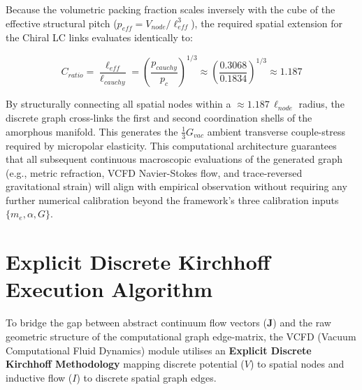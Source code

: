 Because the volumetric packing fraction scales inversely with the cube of the effective structural pitch ($p_{eff} = V_{node} / \ell_{eff}^3$), the required spatial extension for the Chiral LC links evaluates identically to:

\begin{equation}
    C_{ratio} = \frac{\ell_{eff}}{\ell_{cauchy}} = \left( \frac{p_{cauchy}}{p_{c}} \right)^{1/3} \approx \left( \frac{0.3068}{0.1834} \right)^{1/3} \approx \mathbf{1.187}
\end{equation}

By structurally connecting all spatial nodes within a $\approx 1.187 \, \ell_{node}$ radius, the discrete graph cross-links the first and second coordination shells of the amorphous manifold. This generates the $\frac{1}{3} G_{vac}$ ambient transverse couple-stress required by micropolar elasticity. %
This computational architecture guarantees that all subsequent continuous macroscopic evaluations of the generated graph (e.g., metric refraction, VCFD Navier-Stokes flow, and trace-reversed gravitational strain) will align with empirical observation without requiring any further numerical calibration beyond the framework's three calibration inputs $\{m_e, \alpha, G\}$.

\section{Explicit Discrete Kirchhoff Execution Algorithm}
To bridge the gap between abstract continuum flow vectors ($\mathbf{J}$) and the raw geometric structure of the computational graph edge-matrix, the VCFD (Vacuum Computational Fluid Dynamics) module utilises an \textbf{Explicit Discrete Kirchhoff Methodology} mapping discrete potential ($V$) to spatial nodes and inductive flow ($I$) to discrete spatial graph edges.

